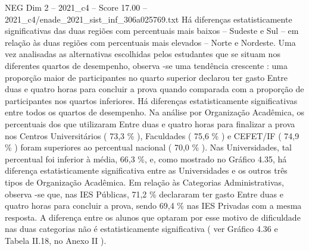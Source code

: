 \begin{textsample}{NEG Dim 2 – 2021\_c4 – Score 17.00 – 2021\_c4/enade\_2021\_sist\_inf\_306a025769.txt}
Há diferenças estatisticamente significativas das duas regiões com percentuais mais baixos – Sudeste e Sul – em relação às duas regiões com percentuais mais elevados – Norte e Nordeste.
Uma vez analisadas as alternativas escolhidas pelos estudantes que se situam nos diferentes quartos de desempenho, observa -se uma tendência crescente : uma proporção maior de participantes no quarto superior declarou ter gasto Entre duas e quatro horas para concluir a prova quando comparada com a proporção de participantes nos quartos inferiores.
Há diferenças estatisticamente significativas entre todos os quartos de desempenho.
Na análise por Organização Acadêmica, os percentuais dos que utilizaram Entre duas e quatro horas para finalizar a prova nos Centros Universitários ( 73,3 \% ), Faculdades ( 75,6 \% ) e CEFET/IF ( 74,9 \% ) foram superiores ao percentual nacional ( 70,0 \% ).
Nas Universidades, tal percentual foi inferior à média, 66,3 \%, e, como mostrado no Gráfico 4.35, há diferença estatisticamente significativa entre as Universidades e os outros três tipos de Organização Acadêmica.
Em relação às Categorias Administrativas, observa -se que, nas IES Públicas, 71,2 \% declararam ter gasto Entre duas e quatro horas para concluir a prova, sendo 69,4 \% nas IES Privadas com a mesma resposta.
A diferença entre os alunos que optaram por esse motivo de dificuldade nas duas categorias não é estatisticamente significativa ( ver Gráfico 4.36 e Tabela II.18, no Anexo II ).

\end{textsample}
